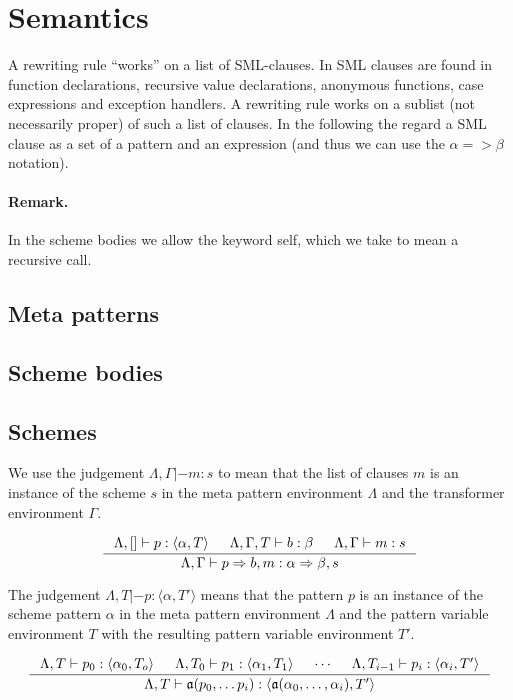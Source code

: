 \section{Semantics}
A rewriting rule ``works'' on a list of SML-clauses. In SML clauses are found in
function declarations, recursive value declarations, anonymous functions, case
expressions and exception handlers. A rewriting rule works on a sublist (not
necessarily proper) of such a list of clauses. In the following the regard a SML
clause as a set of a pattern and an expression (and thus we can use the $\alpha
=> \beta$ notation).

\paragraph{Remark.} In the scheme bodies we allow the keyword \textsf{self},
which we take to mean a recursive call.

\subsection{Meta patterns}

\subsection{Scheme bodies}

\subsection{Schemes}
We use the judgement $\Lambda, \Gamma |- m : s$ to mean that the list of clauses $m$ is
an instance of the scheme $s$ in the meta pattern environment $\Lambda$ and the
transformer environment $\Gamma$.

\[
\inference{\Lambda, [] |- p : \langle \alpha, T \rangle &
  \Lambda, \Gamma, T |- b : \beta &
\Lambda, \Gamma |- m : s}
{\Lambda, \Gamma |- p => b, m : \alpha => \beta, s}
\]

The judgement $\Lambda, T |- p : \langle \alpha, T' \rangle$ means that the
pattern $p$ is an instance of the scheme pattern $\alpha$ in the meta pattern
environment $\Lambda$ and the pattern variable environment $T$ with the
resulting pattern variable environment $T'$.

\[
\inference{\Lambda, T |- p_0 : \langle \alpha_0, T_o \rangle &
\Lambda, T_0 |- p_1 : \langle \alpha_1, T_1 \rangle &
\cdots &
\Lambda, T_{i-1} |- p_i : \langle \alpha_i, T' \rangle
}
{\Lambda, T |- \mathfrak{a}(p_0, \ldots p_i) : \langle \mathfrak{a}(\alpha_0,
  \ldots, \alpha_i), T' \rangle}
\]


